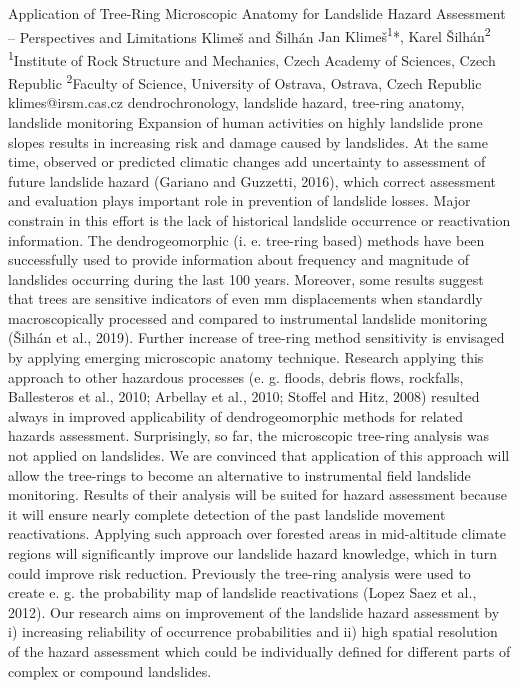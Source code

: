 \abstract
{Application of Tree-Ring Microscopic Anatomy for Landslide Hazard Assessment -- Perspectives and Limitations} 
{Klimeš and Šilhán} 
{Jan Klimeš\textsuperscript{1}*, Karel Šilhán\textsuperscript{2}} 
{\POtag} 
{
\textsuperscript{1}Institute of Rock Structure and Mechanics, Czech Academy of Sciences, Czech Republic
\textsuperscript{2}Faculty of Science, University of Ostrava, Ostrava, Czech Republic
}
{klimes@irsm.cas.cz}  %
{dendrochronology, landslide hazard, tree-ring anatomy, landslide monitoring}
{Expansion of human activities on highly landslide prone slopes results in increasing risk and damage caused by landslides. At the same time, observed or predicted climatic changes add uncertainty to assessment of future landslide hazard (Gariano and Guzzetti, 2016), which correct assessment and evaluation plays important role in prevention of landslide losses. Major constrain in this effort is the lack of historical landslide occurrence or reactivation information. The dendrogeomorphic (i. e. tree-ring based) methods have been successfully used to provide information about frequency and magnitude of landslides occurring during the last 100 years. Moreover, some results suggest that trees are sensitive indicators of even mm displacements when standardly macroscopically processed and compared to instrumental landslide monitoring (Šilhán et al., 2019). Further increase of tree-ring method sensitivity is envisaged by applying emerging microscopic anatomy technique. Research applying this approach to other hazardous processes (e. g. floods, debris flows, rockfalls, Ballesteros et al., 2010; Arbellay et al., 2010; Stoffel and Hitz, 2008) resulted always in improved applicability of dendrogeomorphic methods for related hazards assessment. Surprisingly, so far, the microscopic tree-ring analysis was not applied on landslides. We are convinced that application of this approach will allow the tree-rings to become an alternative to instrumental field landslide monitoring. Results of their analysis will be suited for hazard assessment because it will ensure nearly complete detection of the past landslide movement reactivations. Applying such approach over forested areas in mid-altitude climate regions will significantly improve our landslide hazard knowledge, which in turn could improve risk reduction. 
Previously the tree-ring analysis were used to create e. g. the probability map of landslide reactivations (Lopez Saez et al., 2012). Our research aims on improvement of the landslide hazard assessment by i) increasing reliability of occurrence probabilities and ii) high spatial resolution of the hazard assessment which could be individually defined for different parts of complex or compound landslides. 
}
